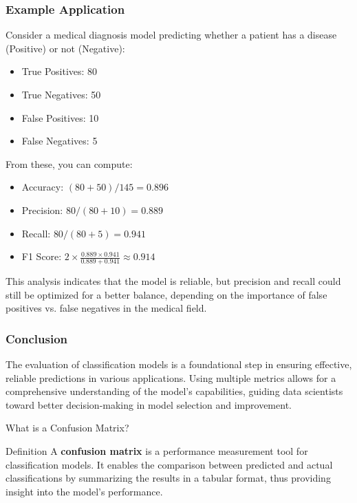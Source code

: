 \documentclass[aspectratio=169]{beamer}
\begin{document}
\begin{frame}[fragile]
    \frametitle{Example Application}
    Consider a medical diagnosis model predicting whether a patient has a disease (Positive) or not (Negative):
    
    \begin{itemize}
        \item True Positives: 80
        \item True Negatives: 50
        \item False Positives: 10
        \item False Negatives: 5
    \end{itemize}

    From these, you can compute:
    \begin{itemize}
        \item Accuracy: \((80 + 50) / 145 = 0.896\)
        \item Precision: \(80 / (80 + 10) = 0.889\)
        \item Recall: \(80 / (80 + 5) = 0.941\)
        \item F1 Score: \(2 \times \frac{0.889 \times 0.941}{0.889 + 0.941} \approx 0.914\)
    \end{itemize}
    
    This analysis indicates that the model is reliable, but precision and recall could still be optimized for a better balance, depending on the importance of false positives vs. false negatives in the medical field.
\end{frame}

\begin{frame}[fragile]
    \frametitle{Conclusion}
    The evaluation of classification models is a foundational step in ensuring effective, reliable predictions in various applications. Using multiple metrics allows for a comprehensive understanding of the model's capabilities, guiding data scientists toward better decision-making in model selection and improvement.
\end{frame}

\begin{frame}[fragile]{What is a Confusion Matrix?}
    \begin{block}{Definition}
        A \textbf{confusion matrix} is a performance measurement tool for classification models. It enables the comparison between predicted and actual classifications by summarizing the results in a tabular format, thus providing insight into the model's performance.
    \end{block}
\end{frame}
\end{document}
